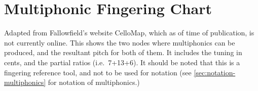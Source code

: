 \chapter{Multiphonic Fingering Chart}\label{app:Multiphonic Fingering Chart}
Adapted from Fallowfield's website CelloMap, which as of time of publication, is not currently online.\autocite[http://www.cellomap.com/index/the-string/multiphonics-and-other-multiple-sounds/fingeringcharts.html]{fallowfieldCelloMap}
This shows the two nodes where multiphonics can be produced, and the resultant pitch for both of them.
It includes the tuning in cents, and the partial ratios (i.e.\ 7+13+6). 
It should be noted that this is a fingering reference tool, and not to be used for notation (see \autoref{sec:notation-multiphonics} for notation of multiphonics.)
